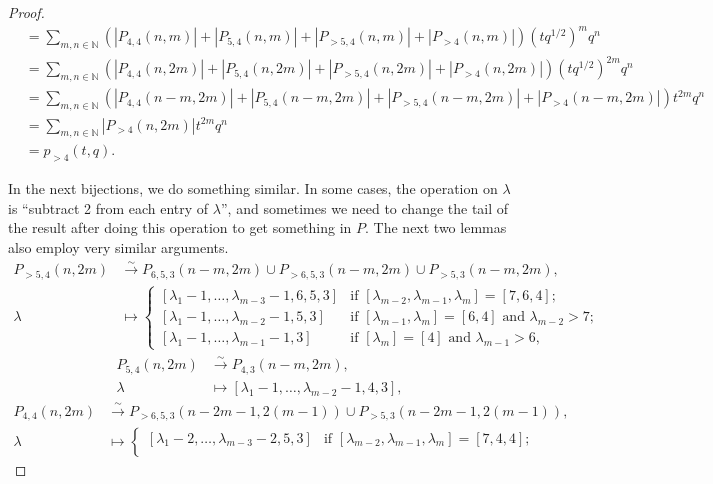 \documentclass[a4paper, 12pt, reqno]{amsart}
\theoremstyle{remark}
\begin{document}
\begin{proof}
\begin{align*}
    &= \sum_{m, n \in \mathbb{N}}(|P_{4, 4}(n, m)| + |P_{5, 4}(n, m)| + |P_{>5, 4}(n, m)| + |P_{>4}(n, m)|)(tq^{1/2})^mq^n \\
    &= \sum_{m, n \in \mathbb{N}}(|P_{4, 4}(n, 2m)| + |P_{5, 4}(n, 2m)| + |P_{>5, 4}(n, 2m)| + |P_{>4}(n, 2m)|)(tq^{1/2})^{2m}q^n \\
    &= \sum_{m, n \in \mathbb{N}}(|P_{4, 4}(n - m, 2m)| + |P_{5, 4}(n - m, 2m)| + |P_{>5, 4}(n - m, 2m)| + |P_{>4}(n - m, 2m)|)t^{2m}q^n \\
    &= \sum_{m, n \in \mathbb{N}}|P_{>4}(n, 2m)|t^{2m}q^n \\
    &= p_{>4}(t, q).
  \end{align*}

  In the next bijections, we do something similar.
  In some cases, the operation on $\lambda$ is ``subtract 2 from each entry of $\lambda$'', and sometimes we need to change the tail of the result after doing this operation to get something in $P$.
  The next two lemmas also employ very similar arguments.
  \begin{align*}
    P_{>5, 4}(n, 2m) &\xrightarrow{\sim} P_{6, 5, 3}(n - m, 2m) \cup P_{>6, 5, 3}(n - m, 2m) \cup P_{>5, 3}(n - m, 2m), \\
    \lambda &\mapsto
              \begin{cases}
                [\lambda_1 - 1, \dots, \lambda_{m - 3} - 1, 6, 5, 3] &\text{if $[\lambda_{m - 2}, \lambda_{m - 1}, \lambda_m] = [7, 6, 4]$}; \\
                [\lambda_1 - 1, \dots, \lambda_{m - 2} - 1, 5, 3] &\text{if $[\lambda_{m - 1}, \lambda_m] = [6, 4]$ and $\lambda_{m - 2} > 7$}; \\
                [\lambda_1 - 1, \dots, \lambda_{m - 1} - 1, 3] &\text{if $[\lambda_m] = [4]$ and $\lambda_{m - 1} > 6$},
              \end{cases}
  \end{align*}
  \begin{align*}
    P_{5, 4}(n, 2m) &\xrightarrow{\sim} P_{4, 3}(n - m, 2m), \\
    \lambda &\mapsto [\lambda_1 - 1, \dots, \lambda_{m - 2} - 1, 4, 3],
  \end{align*}
  \begin{align*}
    P_{4, 4}(n, 2m) &\xrightarrow{\sim} P_{>6, 5, 3}(n - 2m - 1, 2(m - 1)) \cup P_{>5, 3}(n - 2m - 1, 2(m - 1)), \\
    \lambda &\mapsto
              \begin{cases}
                [\lambda_1 - 2, \dots, \lambda_{m - 3} - 2, 5, 3] &\text{if $[\lambda_{m - 2}, \lambda_{m - 1}, \lambda_m] = [7, 4, 4]$}; \\

\end{cases}
\end{align*}
\end{proof}
\end{document}
